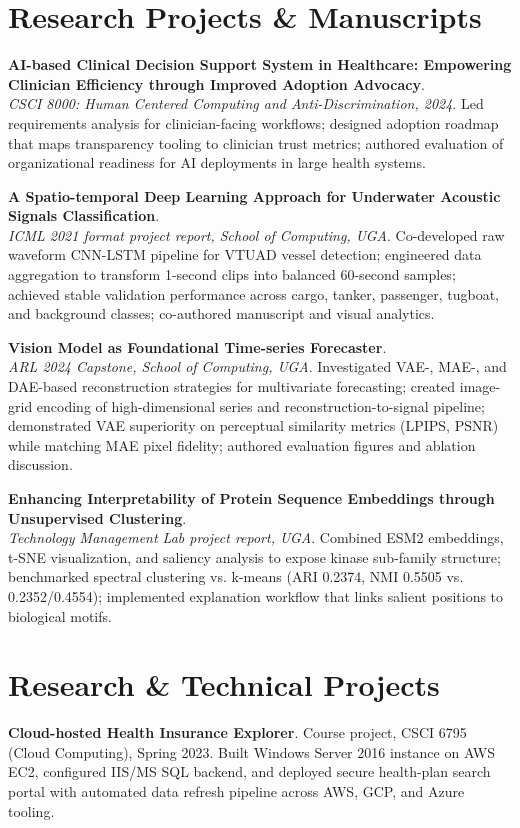 \documentclass[11pt]{article}
\begin{document}
\section*{Research Projects \& Manuscripts}
\textbf{AI-based Clinical Decision Support System in Healthcare: Empowering Clinician Efficiency through Improved Adoption Advocacy}.\\
\emph{CSCI 8000: Human Centered Computing and Anti-Discrimination, 2024}. Led requirements analysis for clinician-facing workflows; designed adoption roadmap that maps transparency tooling to clinician trust metrics; authored evaluation of organizational readiness for AI deployments in large health systems.

\textbf{A Spatio-temporal Deep Learning Approach for Underwater Acoustic Signals Classification}.\\
\emph{ICML 2021 format project report, School of Computing, UGA}. Co-developed raw waveform CNN-LSTM pipeline for VTUAD vessel detection; engineered data aggregation to transform 1-second clips into balanced 60-second samples; achieved stable validation performance across cargo, tanker, passenger, tugboat, and background classes; co-authored manuscript and visual analytics.

\textbf{Vision Model as Foundational Time-series Forecaster}.\\
\emph{ARL 2024 Capstone, School of Computing, UGA}. Investigated VAE-, MAE-, and DAE-based reconstruction strategies for multivariate forecasting; created image-grid encoding of high-dimensional series and reconstruction-to-signal pipeline; demonstrated VAE superiority on perceptual similarity metrics (LPIPS, PSNR) while matching MAE pixel fidelity; authored evaluation figures and ablation discussion.

\textbf{Enhancing Interpretability of Protein Sequence Embeddings through Unsupervised Clustering}.\\
\emph{Technology Management Lab project report, UGA}. Combined ESM2 embeddings, t-SNE visualization, and saliency analysis to expose kinase sub-family structure; benchmarked spectral clustering vs. k-means (ARI 0.2374, NMI 0.5505 vs. 0.2352/0.4554); implemented explanation workflow that links salient positions to biological motifs.

\section*{Research \& Technical Projects}
\textbf{Cloud-hosted Health Insurance Explorer}. Course project, CSCI 6795 (Cloud Computing), Spring 2023. Built Windows Server 2016 instance on AWS EC2, configured IIS/MS SQL backend, and deployed secure health-plan search portal with automated data refresh pipeline across AWS, GCP, and Azure tooling.
\end{document}
